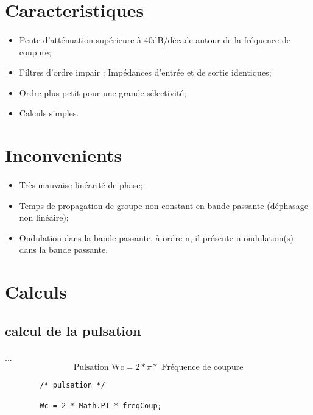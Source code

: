 \documentclass[a4paper,11pt]{article}
\begin{document}
    \clearpage

\section{Caracteristiques}
    \paragraph{}
    \begin{itemize}
        \item Pente d’atténuation supérieure à 40dB/décade autour de la fréquence de coupure;
        \item Filtres d’ordre impair : Impédances d’entrée et de sortie identiques;
        \item Ordre plus petit pour une grande sélectivité;
        \item Calculs simples.
    \end{itemize}

\section{Inconvenients}
    \paragraph{}
    \begin{itemize}
        \item Très mauvaise linéarité de phase;
        \item Temps de propagation de groupe non constant en bande passante (déphasage non linéaire);
        \item Ondulation dans la bande passante, à ordre n, il présente n ondulation(s) dans la bande passante.
    \end{itemize}

    \clearpage

\section{Calculs}
\subsection{calcul de la pulsation}
    \paragraph{}
    ...\[ \mbox{Pulsation Wc} = 2 * \pi * \mbox{ Fréquence de coupure}\]
    \begin{lstlisting}
        /* pulsation */

        Wc = 2 * Math.PI * freqCoup;

    \end{lstlisting}
\end{document}
